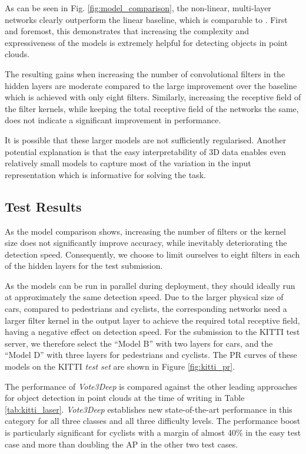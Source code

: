 \documentclass[letterpaper, 10 pt, conference]{tex_style/ieeeconf}
\begin{document}
As can be seen in Fig. \ref{fig:model_comparison}, the non-linear, multi-layer networks clearly outperform the linear baseline, which is comparable to \cite{wang2015voting}.
First and foremost, this demonstrates that increasing the complexity and expressiveness of the models is extremely helpful for detecting objects in point clouds.

The resulting gains when increasing the number of convolutional filters in the hidden layers are moderate compared to the large improvement over the baseline which is achieved with only eight filters.
Similarly, increasing the receptive field of the filter kernels, while keeping the total receptive field of the networks the same, does not indicate a significant improvement in performance.

It is possible that these larger models are not sufficiently regularised.
Another potential explanation is that the easy interpretability of 3D data enables even relatively small models to capture most of the variation in the input representation which is informative for solving the task.



\subsection{Test Results}
\label{sec:test_results}

As the model comparison shows, increasing the number of filters or the kernel size does not significantly improve accuracy, while inevitably deteriorating the detection speed.
Consequently, we choose to limit ourselves to eight  filters in each of the hidden layers for the test submission.

As the models can be run in parallel during deployment, they should ideally run at approximately the same detection speed.
Due to the larger physical size of cars, compared to pedestrians and cyclists, the corresponding networks need a larger filter kernel in the output layer to achieve the required total receptive field, having a negative effect on detection speed.
For the submission to the KITTI test server, we therefore select the ``Model B'' with two layers for cars, and the ``Model D'' with three layers for pedestrians and cyclists.
The PR curves of these models on the KITTI \emph{test set} are shown in Figure \ref{fig:kitti_pr}.

The performance of \emph{Vote3Deep} is compared against the other leading approaches for object detection in point clouds at the time of writing in Table \ref{tab:kitti_laser}.
\emph{Vote3Deep} establishes new state-of-the-art performance in this category for all three classes and all three difficulty levels.
The performance boost is particularly significant for cyclists with a margin of almost 40\% in the easy test case and more than doubling the AP in the other two test cases.
\end{document}
